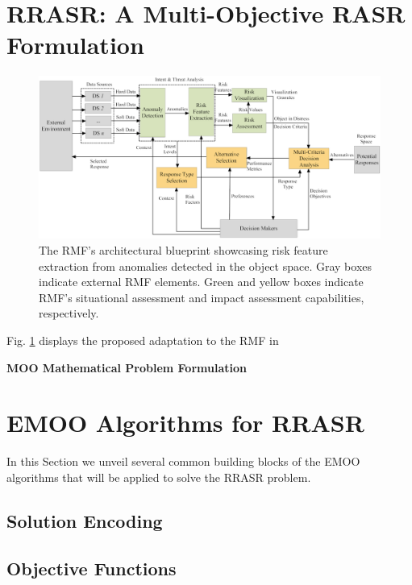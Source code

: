 \documentclass[conference]{IEEEtran}
\begin{document}
\section{RRASR: A Multi-Objective RASR Formulation}
\label{sec:MOOProblem}

\begin{figure}[!htbp]
\centerline{\includegraphics[width=\textwidth]{img/dataFlow-intentAnalysisRMF}}
\caption{The RMF's architectural blueprint showcasing risk feature extraction from anomalies detected in the object space. Gray boxes indicate external RMF elements. Green and yellow boxes indicate RMF's situational assessment and impact assessment capabilities, respectively.}
\label{fig:IntentAnalysisRMF}
\end{figure}

Fig. \ref{fig:IntentAnalysisRMF} displays the proposed adaptation to the RMF in \cite{Falcon2011:RiskManagement-CIMSA} \cite{Falcon2012:ResponseAwareRMF-CEC} 

\textbf{MOO Mathematical Problem Formulation}

\section{EMOO Algorithms for RRASR}
\label{sec:Algorithms}

In this Section we unveil several common building blocks of the EMOO algorithms that will be applied to solve the RRASR problem.

\subsection{Solution Encoding}
\label{sec:Algorithms:Encoding}

\subsection{Objective Functions}
\label{sec:Algorithms:ObjFunctions}
\end{document}

